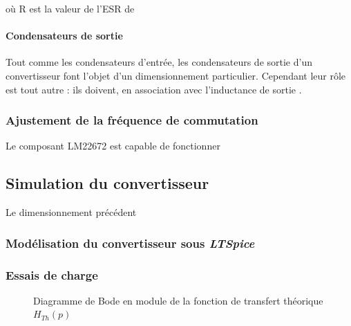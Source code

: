 						où R est la valeur de l'ESR de
						
								
							\paragraph{Condensateurs de sortie}
							
							Tout comme les condensateurs d'entrée, les condensateurs de sortie d'un convertisseur font l'objet d'un dimensionnement particulier. Cependant leur rôle est tout autre : ils doivent, en association avec l'inductance de sortie \cite{A055}.	
				
				
			
			\subsubsection{Ajustement de la fréquence de commutation}
			
			Le composant LM22672 est capable de fonctionner 
			
			\subsection{Simulation du convertisseur}
			
			Le dimensionnement précédent
			
				\subsubsection{Modélisation du convertisseur sous \textit{LTSpice}}
				
				\subsubsection{Essais de charge}
				
				\begin{figure}[h]
\begin{center}
\end{center}
\label{filtre_th}
\caption{Diagramme de Bode en module de la fonction de transfert théorique $H_{Th}(p)$}
\end{figure}
				
